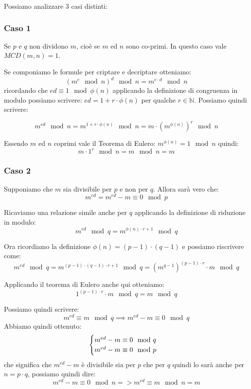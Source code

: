 Possiamo analizzare 3 casi distinti:

\subsubsection{Caso 1}
Se $p$ e $q$ non dividono $m$, cioè se $m$ ed $n$ sono co-primi. In questo caso vale $MCD(m,n)=1$.

Se componiamo le formule per criptare e decriptare otteniamo:
$$ (m^e \mod n)^d \mod n = m^{e \cdot d} \mod n $$
ricordando che $ed \equiv 1 \mod \phi(n)$ applicando la definizione di congruenza in modulo possiamo scrivere: $ed = 1 + r \cdot \phi(n)$ per qualche $r \in \mathbb{N}$.
Possiamo quindi scrivere:

$$ m^{ed} \mod n = m^{1 + r \cdot \phi(n)} \mod n = m \cdot (m^{\phi(n)})^{r} \mod n$$

Essendo $m$ ed $n$ coprimi vale il Teorema di Eulero: $m^{\phi(n)} = 1 \mod n$ quindi:
$$ m \cdot 1^r \mod n = m \mod n = m $$

\subsubsection{Caso 2}
Supponiamo che $m$ sia divisibile per $p$ e non per $q$. Allora sarà vero che:
$$ m^{ed} = m^{ed} - m \equiv 0 \mod p $$

Ricaviamo una relazione simile anche per $q$ applicando la definizione di riduzione in modulo:
$$ m^{ed} \mod q = m^{\phi(n) \cdot r + 1} \mod q $$

Ora ricordiamo la definizione $\phi(n) = (p-1)\cdot(q-1)$ e possiamo riscrivere come:
$$ m^{ed} \mod q = m^{(p-1)\cdot(q-1)\cdot{r} + 1} \mod q = (m^{q-1})^{(p-1)\cdot{r}}\cdot{m} \mod q $$

Applicando il teorema di Eulero anche qui otteniamo:
$$ 1^{(p-1)\cdot{r}}\cdot{m} \mod q = m \mod q$$

Possiamo quindi scrivere:
$$ m^{ed} \equiv m \mod q \implies m^{ed} - m \equiv 0 \mod q $$
Abbiamo quindi ottenuto:
\begin{equation}
    \begin{cases}
    $$ m^{ed} - m \equiv 0 \mod q $$ \\ 
    $$ m^{ed} - m \equiv 0 \mod p $$
    \end{cases}
\end{equation}
che significa che $ m^{ed} -m $ è divisibile sia per $p$ che per $q$ quindi lo sarà anche per $n = p \cdot q$, possiamo quindi dire:
$$ m^{ed} -m \equiv 0 \mod n => m^{ed} \equiv m \mod n = m $$


